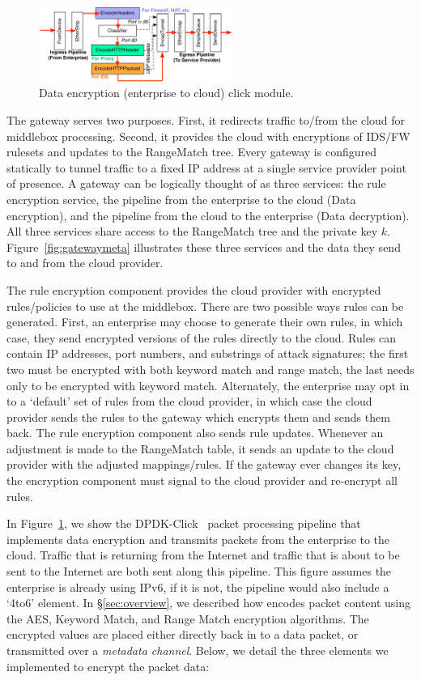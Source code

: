\begin{figure}[t]
  \centering
  \includegraphics[width=2.5in]{fig/gatewaydiag}
  \caption[]{\label{fig:gateway} Data encryption (enterprise to cloud) click module.}
\end{figure}

The gateway serves two purposes. First, it redirects traffic to/from the cloud for middlebox processing. Second, it provides the cloud with encryptions of IDS/FW rulesets and updates to the RangeMatch tree.
Every gateway is configured statically to tunnel traffic to a fixed IP address at a single service provider point of presence.
A gateway can be logically thought of as three services: the rule encryption service, the pipeline from the enterprise to the cloud (Data encryption), and the pipeline from the cloud to the enterprise (Data decryption). 
All three services share access to the RangeMatch tree and the private key $k$.
Figure~\ref{fig:gatewaymeta} illustrates  these three services and the data they send to and from the cloud provider.

 The rule encryption component provides the cloud provider with encrypted rules/policies to use at the middlebox. 
There are two possible ways rules can be generated. First, an enterprise may choose to generate their own rules, in which case, they send encrypted versions of the rules directly to the cloud.
Rules can contain IP addresses, port numbers, and substrings of attack signatures; the first two must be encrypted with both keyword match and range match, the last needs only to be encrypted with keyword match.
Alternately, the enterprise may opt in to a `default' set of rules from the cloud provider, in which case the cloud provider sends the rules to the gateway which encrypts them and sends them back.
The rule encryption component also sends rule updates. Whenever an adjustment is made to the RangeMatch table, it sends an update to the cloud provider with the adjusted mappings/rules.
If the gateway ever changes its key, the encryption component must signal to the cloud provider and re-encrypt all rules.

 In Figure~\ref{fig:gateway}, we show the DPDK-Click~\cite{click} packet processing pipeline that implements data encryption and transmits packets from the enterprise to the cloud.
Traffic that is returning from the Internet and traffic that is about to be sent to the Internet are both sent along this pipeline.
This figure assumes the enterprise is already using IPv6, if it is not, the pipeline would also include a `4to6' element.
In \S\ref{sec:overview}, we described how \sys encodes packet content using the AES, Keyword Match, and Range Match encryption algorithms. 
The encrypted values are placed either directly back in to a data packet, or transmitted over a {\it metadata channel}.
Below, we detail the three elements we implemented to encrypt the packet data:

